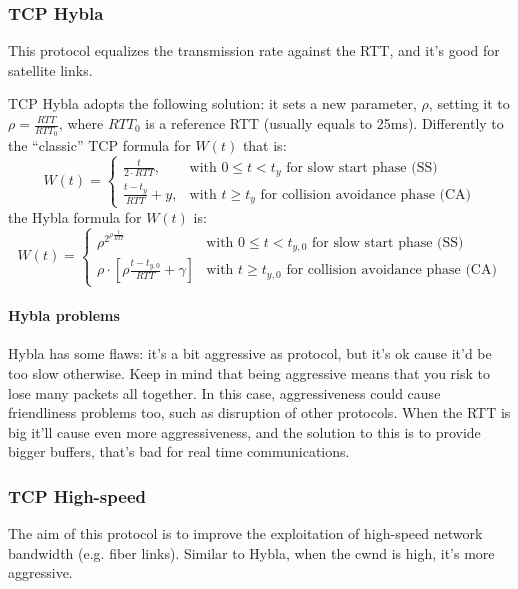 \subsubsection{TCP Hybla}
\label{prt:tcp:hybla}

This protocol equalizes the transmission rate against the RTT, and it's good for
satellite links.

TCP Hybla adopts the following solution: it sets a new parameter, $\rho$,
setting it to $\rho = \frac{RTT}{RTT_0}$, where $RTT_0$ is a reference RTT
(usually equals to 25ms).
Differently to the ``classic'' TCP formula for $W(t)$ that is:
\begin{equation*}
  W(t) = \begin{cases}
    \frac{t}{2 \cdot RTT}, & \mbox{with } 0 \le t < t_y \mbox{ for slow start phase (SS)} \\
    \frac{t - t_y}{RTT} + y, & \mbox{with } t \ge t_y \mbox{ for collision avoidance phase (CA)}
  \end{cases}
\end{equation*}
the Hybla formula for $W(t)$ is:
\begin{equation}
  W(t) = \begin{cases}
    \rho^{2^{\rho \frac{t}{RTT}}} & \mbox{with } 0 \le t < t_{y,0} \mbox{ for slow start phase (SS)} \\
    \rho \cdot \left [\rho\frac{t - t_{y,0}}{RTT} + \gamma \right ] & \mbox{with } t \ge t_{y,0} \mbox{ for collision avoidance phase (CA)}
  \end{cases}
\end{equation}

\paragraph*{Hybla problems} Hybla has some flaws: it's a bit aggressive as
protocol, but it's ok cause it'd be too slow otherwise. Keep in mind that being
aggressive means that you risk to lose many packets all together. In this case,
aggressiveness could cause friendliness problems too, such as disruption of
other protocols.
When the RTT is big it'll cause even more aggressiveness, and the solution to
this is to provide bigger buffers, that's bad for real time communications.

\subsubsection{TCP High-speed}
The aim of this protocol is to improve the exploitation of high-speed network
bandwidth (e.g. fiber links). Similar to Hybla, when the cwnd is high, it's
more aggressive.

